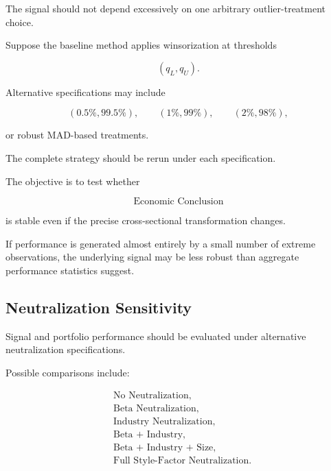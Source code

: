 \documentclass[11pt,a4paper]{article}
\begin{document}
The signal should not depend excessively on one arbitrary outlier-treatment
choice.

Suppose the baseline method applies winsorization at thresholds

\begin{equation}
(q_L,q_U).
\end{equation}

Alternative specifications may include

\begin{equation}
(0.5\%,99.5\%),
\qquad
(1\%,99\%),
\qquad
(2\%,98\%),
\end{equation}

or robust MAD-based treatments.

The complete strategy should be rerun under each specification.

The objective is to test whether

\begin{equation}
\boxed{
\text{Economic Conclusion}
}
\end{equation}

is stable even if the precise cross-sectional transformation changes.

If performance is generated almost entirely by a small number of extreme
observations, the underlying signal may be less robust than aggregate
performance statistics suggest.


\subsection{Neutralization Sensitivity}
\label{subsec:neutralization_sensitivity}

Signal and portfolio performance should be evaluated under alternative
neutralization specifications.

Possible comparisons include:

\begin{equation}
\boxed{
\begin{aligned}
&\text{No Neutralization},
\\
&\text{Beta Neutralization},
\\
&\text{Industry Neutralization},
\\
&\text{Beta + Industry},
\\
&\text{Beta + Industry + Size},
\\
&\text{Full Style-Factor Neutralization}.
\end{aligned}
}
\end{equation}
\end{document}
